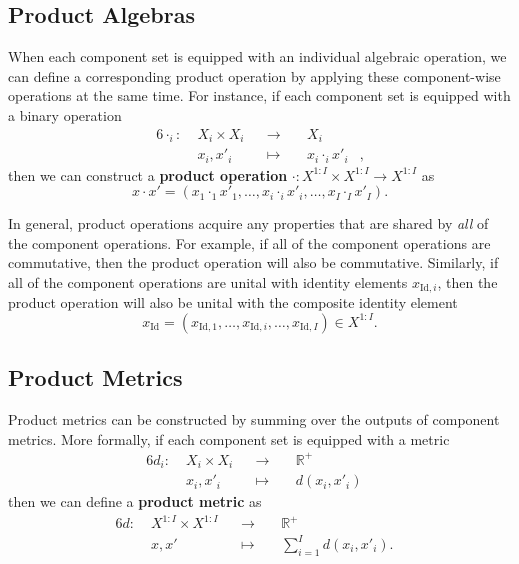 \documentclass[
  letterpaper,
  DIV=11,
  numbers=noendperiod]{scrartcl}
\begin{document}
\subsection{Product Algebras}\label{product-algebras}

When each component set is equipped with an individual algebraic
operation, we can define a corresponding product operation by applying
these component-wise operations at the same time. For instance, if each
component set is equipped with a binary operation \begin{alignat*}{6}
\cdot_{i} :\; & X_{i} \times X_{i}& &\rightarrow& \; & X_{i} &
\\
& x_{i}, x'_{i} & &\mapsto& & x_{i} \cdot_{i} x'_{i} &,
\end{alignat*} then we can construct a \textbf{product operation}
\(\cdot : X^{1:I} \times X^{1:I} \rightarrow X^{1:I}\) as \[
x \cdot x' =
( x_{1} \cdot_{1} x'_{1}, \ldots,
  x_{i} \cdot_{i} x'_{i}, \ldots,
  x_{I} \cdot_{I} x'_{I} ).
\]

In general, product operations acquire any properties that are shared by
\emph{all} of the component operations. For example, if all of the
component operations are commutative, then the product operation will
also be commutative. Similarly, if all of the component operations are
unital with identity elements \(x_{\text{Id}, i}\), then the product
operation will also be unital with the composite identity element \[
x_{\text{Id}} = (x_{\text{Id}, 1}, \ldots,
                 x_{\text{Id}, i}, \ldots,
                 x_{\text{Id}, I})
\in X^{1:I}.
\]

\subsection{Product Metrics}\label{product-metrics}

Product metrics can be constructed by summing over the outputs of
component metrics. More formally, if each component set is equipped with
a metric \begin{alignat*}{6}
d_{i} :\; & X_{i} \times X_{i}& &\rightarrow& \; & \mathbb{R}^{+} &
\\
& x_{i}, x'_{i} & &\mapsto& & d(x_{i}, x'_{i}) &
\end{alignat*} then we can define a \textbf{product metric} as
\begin{alignat*}{6}
d :\; & X^{1:I} \times X^{1:I}& &\rightarrow& \; & \mathbb{R}^{+} &
\\
& x, x' & &\mapsto& & \sum_{i = 1}^{I} d(x_{i}, x'_{i}). &
\end{alignat*}
\end{document}
